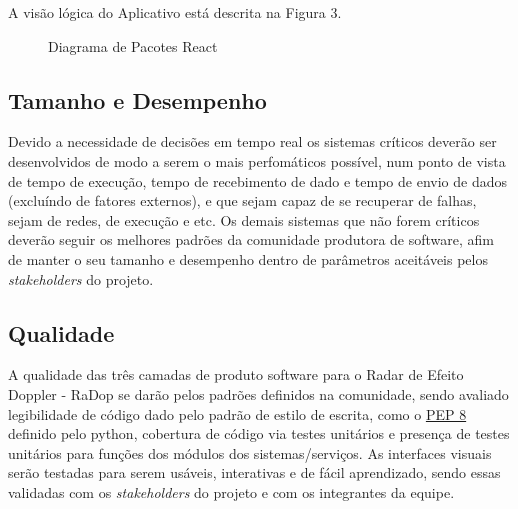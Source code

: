 A visão lógica do Aplicativo está descrita na Figura 3.

\begin{figure}[!htb]
    \caption{\label{fig:diagrama-pact-react}Diagrama de Pacotes React}
\end{figure}

\subsection{Tamanho e Desempenho}\label{tamanho-e-desempenho}

Devido a necessidade de decisões em tempo real os sistemas críticos
deverão ser desenvolvidos de modo a serem o mais perfomáticos possível,
num ponto de vista de tempo de execução, tempo de recebimento de dado e
tempo de envio de dados (excluíndo de fatores externos), e que sejam
capaz de se recuperar de falhas, sejam de redes, de execução e etc. Os
demais sistemas que não forem críticos deverão seguir os melhores
padrões da comunidade produtora de software, afim de manter o seu
tamanho e desempenho dentro de parâmetros aceitáveis pelos
\emph{stakeholders} do projeto.

\subsection{Qualidade}\label{qualidade}

A qualidade das três camadas de produto software para o Radar de Efeito
Doppler - RaDop se darão pelos padrões definidos na comunidade, sendo
avaliado legibilidade de código dado pelo padrão de estilo de escrita,
como o \href{https://www.python.org/dev/peps/pep-0008/}{PEP 8} definido
pelo python, cobertura de código via testes unitários e presença de
testes unitários para funções dos módulos dos sistemas/serviços. As
interfaces visuais serão testadas para serem usáveis, interativas e de
fácil aprendizado, sendo essas validadas com os \emph{stakeholders} do
projeto e com os integrantes da equipe.
